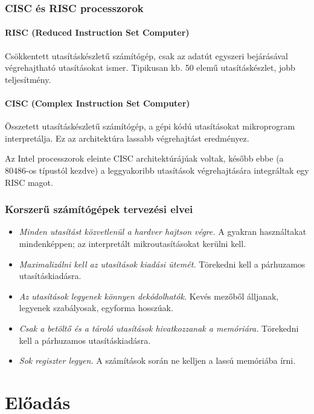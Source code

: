 \documentclass[a4paper]{article}
\begin{document}
\subsubsection{CISC és RISC processzorok}

\paragraph{RISC (Reduced Instruction Set Computer)} Csökkentett utasításkészletű számítógép, csak az adatút egyszeri bejárásával végrehajtható utasításokat ismer. Tipikusan kb. 50 elemű utasításkészlet, jobb teljesítmény.

\paragraph{CISC (Complex Instruction Set Computer)} Összetett utasításkészletű számítógép, a gépi kódú utasításokat mikroprogram interpretálja. Ez az architektúra lassabb végrehajtást eredményez.

Az Intel processzorok eleinte CISC architektúrájúak voltak, később ebbe (a 80486-os típustól kezdve) a leggyakoribb utasítások végrehajtására integráltak egy RISC magot.

\subsubsection{Korszerű számítógépek tervezési elvei}

\begin{itemize}
	\item \emph{Minden utasítást közvetlenül a hardver hajtson végre.} A gyakran használtakat mindenképpen; az interpretált mikroutasításokat kerülni kell.
	\item \emph{Maximalizálni kell az utasítások kiadási ütemét.} Törekedni kell a párhuzamos utasításkiadásra.
	\item \emph{Az utasítások legyenek könnyen dekódolhatók.} Kevés mezőből álljanak, legyenek szabályosak, egyforma hosszúak.
	\item \emph{Csak a betöltő és a tároló utasítások hivatkozzanak a memóriára.} Törekedni kell a párhuzamos utasításkiadásra.
	\item \emph{Sok regiszter legyen.} A számítások során ne kelljen a lassú memóriába írni.
\end{itemize}

\section{Előadás}
\end{document}
